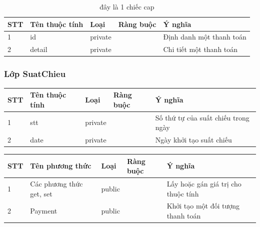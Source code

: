 \documentclass[a4paper, 12pt]{article}
\begin{document}
\begin{table}[H]
	\begin{center}
		\begin{tabular}{|l|l|l|l|l|}
		\hline
		STT & Tên thuộc tính & Loại    & Ràng buộc & Ý nghĩa                  \\ \hline
		1   & id             & private &           & Định danh một thanh toán \\ \hline
		2   & detail         & private &           & Chi tiết một thanh toán  \\ \hline
		\end{tabular}
		\caption{đây là 1 chiếc cap}
	\end{center}
\end{table}

\subsubsection{Lớp SuatChieu}
\begin{table}[H]
\centering
\begin{tabular}{|l|l|l|l|l|}
\hline
STT & Tên thuộc tính & Loại    & Ràng buộc & Ý nghĩa                             \\ \hline
1   & stt            & private &           & Số thứ tự của suất chiếu trong ngày \\ \hline
2   & date           & private &           & Ngày khởi tạo suất chiếu            \\ \hline
\end{tabular}
\end{table}
\begin{table}[H]
\centering
\begin{tabular}{|l|l|l|l|l|}
\hline
STT & Tên phương thức          & Loại   & Ràng buộc & Ý nghĩa                             \\ \hline
1   & Các phương thức get, set & public &           & Lấy hoặc gán giá trị cho thuộc tính \\ \hline
2   & Payment                  & public &           & Khởi tạo một đối tượng thanh toán   \\ \hline
\end{tabular}
\end{table}
\end{document}
